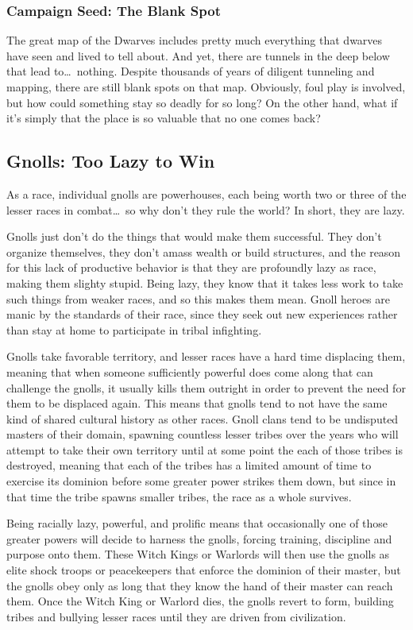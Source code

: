 \subsubsection{Campaign Seed: The Blank Spot}
The great map of the Dwarves includes pretty much everything that dwarves have seen and lived to tell about. And yet, there are tunnels in the deep below that lead to\ldots\  nothing. Despite thousands of years of diligent tunneling and mapping, there are still blank spots on that map. Obviously, foul play is involved, but how could something stay so deadly for so long? On the other hand, what if it's simply that the place is so valuable that no one comes back?

\subsection{Gnolls: Too Lazy to Win}
As a race, individual gnolls are powerhouses, each being worth two or three of the lesser races in combat\ldots\ so why don't they rule the world? In short, they are lazy.

Gnolls just don't do the things that would make them successful. They don't organize themselves, they don't amass wealth or build structures, and the reason for this lack of productive behavior is that they are profoundly lazy as race, making them slighty stupid. Being lazy, they know that it takes less work to take such things from weaker races, and so this makes them mean. Gnoll heroes are manic by the standards of their race, since they seek out new experiences rather than stay at home to participate in tribal infighting.

Gnolls take favorable territory, and lesser races have a hard time displacing them, meaning that when someone sufficiently powerful does come along that can challenge the gnolls, it usually kills them outright in order to prevent the need for them to be displaced again. This means that gnolls tend to not have the same kind of shared cultural history as other races. Gnoll clans tend to be undisputed masters of their domain, spawning countless lesser tribes over the years who will attempt to take their own territory until at some point the each of those tribes is destroyed, meaning that each of the tribes has a limited amount of time to exercise its dominion before some greater power strikes them down, but since in that time the tribe spawns smaller tribes, the race as a whole survives.

Being racially lazy, powerful, and prolific means that occasionally one of those greater powers will decide to harness the gnolls, forcing training, discipline and purpose onto them. These Witch Kings or Warlords will then use the gnolls as elite shock troops or peacekeepers that enforce the dominion of their master, but the gnolls obey only as long that they know the hand of their master can reach them. Once the Witch King or Warlord dies, the gnolls revert to form, building tribes and bullying lesser races until they are driven from civilization.

